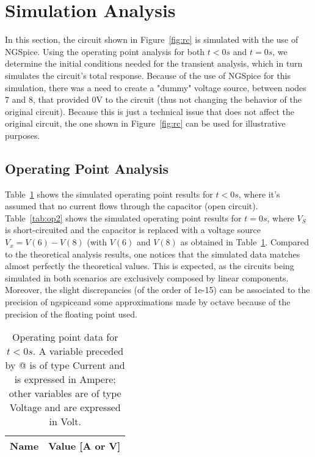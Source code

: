 \section{Simulation Analysis}
\label{sec:simulation}

In this section, the circuit shown in Figure~\ref{fig:rc} is simulated with the use of NGSpice. Using the operating point analysis for both $t<0 s$ and $t=0 s$, we determine the initial conditions needed for the transient analysis, which in turn simulates the circuit's total response.
Because of the use of NGSpice for this simulation, there was a need to create a "dummy" voltage source, between nodes 7 and 8, that provided 0V to the circuit (thus not changing the behavior of the original circuit). Because this is just a technical issue that does not affect the original circuit, the one shown in Figure~\ref{fig:rc} can be used for illustrative purposes.


\subsection{Operating Point Analysis}

Table~\ref{tab:op} shows the simulated operating point results for $t<0 s$, where it's assumed that no current flows through the capacitor (open circuit).
Table~\ref{tab:op2} shows the simulated operating point results for $t=0 s$, where $V_S$ is short-circuited and the capacitor is replaced with a voltage source $V_x = V(6) - V(8)$ (with $V(6)$ and $V(8)$ as obtained in Table~\ref{tab:op}.
Compared to the theoretical analysis results, one notices that the simulated data matches almost perfectly the theoretical values. This is expected, as the circuits being simulated in both scenarios are exclusively composed by linear components. Moreover, the slight discrepancies (of the order of 1e-15) can be associated to the precision of ngspiceand some approximations made by octave because of the precision of the floating point used.

\begin{table}[h]
  \centering
  \begin{tabular}{|l|r|}
    \hline    
    {\bf Name} & {\bf Value [A or V]} \\ \hline
    
  \end{tabular}
  \caption{Operating point data for $t<0 s$. A variable preceded by @ is of type Current and is expressed in Ampere; other variables are of type Voltage and are expressed in Volt.}
  \label{tab:op}
\end{table}

